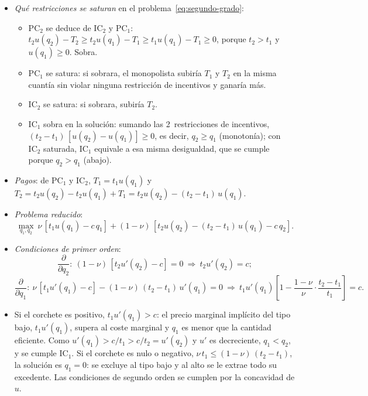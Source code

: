 \documentclass[11pt]{article}
\begin{document}
\begin{itemize}
\item \emph{Qué restricciones se saturan} en el problema~\eqref{eq:segundo-grado}:
  \begin{itemize}
  \item $\mathrm{PC}_2$ se deduce de $\mathrm{IC}_2$ y $\mathrm{PC}_1$: $t_2u(q_2)-T_2\geq t_2u(q_1)-T_1\geq t_1u(q_1)-T_1\geq 0$, porque $t_2>t_1$ y $u(q_1)\geq 0$. Sobra.
  \item $\mathrm{PC}_1$ se satura: si sobrara, el monopolista subiría $T_1$ y $T_2$ en la misma cuantía sin violar ninguna restricción de incentivos y ganaría más.
  \item $\mathrm{IC}_2$ se satura: si sobrara, subiría $T_2$.
  \item $\mathrm{IC}_1$ sobra en la solución: sumando las 2~restricciones de incentivos, $(t_2-t_1)\,[u(q_2)-u(q_1)]\geq 0$, es decir, $q_2\geq q_1$ (monotonía); con $\mathrm{IC}_2$ saturada, $\mathrm{IC}_1$ equivale a esa misma desigualdad, que se cumple porque $q_2>q_1$ (abajo).
  \end{itemize}
\item \emph{Pagos}: de $\mathrm{PC}_1$ y $\mathrm{IC}_2$, $T_1=t_1u(q_1)$ y $T_2=t_2u(q_2)-t_2u(q_1)+T_1=t_2u(q_2)-(t_2-t_1)\,u(q_1)$.
\item \emph{Problema reducido}:
  \begin{equation}
  \max_{q_1,q_2}\ \nu\,[t_1u(q_1)-c\,q_1]+(1-\nu)\,[t_2u(q_2)-(t_2-t_1)\,u(q_1)-c\,q_2].
  \end{equation}
\item \emph{Condiciones de primer orden}:
  \begin{equation}
  \frac{\partial}{\partial q_2}:\ (1-\nu)\,[t_2u'(q_2)-c]=0\ \Rightarrow\ t_2u'(q_2)=c;
  \end{equation}
  \begin{equation}
  \frac{\partial}{\partial q_1}:\ \nu\,[t_1u'(q_1)-c]-(1-\nu)\,(t_2-t_1)\,u'(q_1)=0\ \Rightarrow\ t_1u'(q_1)\left[1-\frac{1-\nu}{\nu}\cdot\frac{t_2-t_1}{t_1}\right]=c .
  \end{equation}
\item Si el corchete es positivo, $t_1u'(q_1)>c$: el precio marginal implícito del tipo bajo, $t_1u'(q_1)$, supera al coste marginal y $q_1$ es menor que la cantidad eficiente. Como $u'(q_1)>c/t_1>c/t_2=u'(q_2)$ y $u'$ es decreciente, $q_1<q_2$, y se cumple $\mathrm{IC}_1$. Si el corchete es nulo o negativo, $\nu\,t_1\leq(1-\nu)\,(t_2-t_1)$, la solución es $q_1=0$: se excluye al tipo bajo y al alto se le extrae todo su excedente. Las condiciones de segundo orden se cumplen por la concavidad de $u$.\findemo

\end{itemize}
\end{document}
